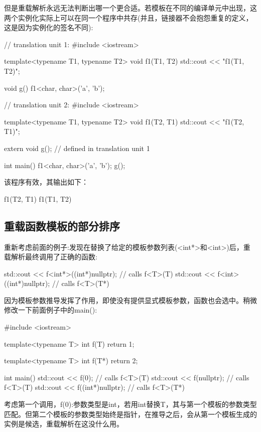 但是重载解析永远无法判断出哪一个更合适。若模板在不同的编译单元中出现，这两个实例化实际上可以在同一个程序中共存(并且，链接器不会抱怨重复的定义，这是因为实例化的签名不同):

\begin{cpp}
// translation unit 1:
#include <iostream>

template<typename T1, typename T2>
void f1(T1, T2)
{
	std::cout << "f1(T1, T2)\n";
}

void g()
{
	f1<char, char>(’a’, ’b’);
}

// translation unit 2:
#include <iostream>

template<typename T1, typename T2>
void f1(T2, T1)
{
	std::cout << "f1(T2, T1)\n";
}

extern void g(); // defined in translation unit 1

int main()
{
	f1<char, char>(’a’, ’b’);
	g();
}
\end{cpp}

该程序有效，其输出如下：

\begin{shell}
f1(T2, T1)
f1(T1, T2)
\end{shell}

\subsection{重载函数模板的部分排序}

重新考虑前面的例子:发现在替换了给定的模板参数列表(<int*>和<int>)后，重载解析最终调用了正确的函数:

\begin{shell}
std::cout << f<int*>((int*)nullptr); // calls f<T>(T)
std::cout << f<int>((int*)nullptr); // calls f<T>(T*)
\end{shell}

因为模板参数推导发挥了作用，即使没有提供显式模板参数，函数也会选中。稍微修改一下前面例子中的main():

\begin{cpp}
#include <iostream>

template<typename T>
int f(T)
{
	return 1;
}

template<typename T>
int f(T*)
{
	return 2;
}

int main()
{
	std::cout << f(0); // calls f<T>(T)
	std::cout << f(nullptr); // calls f<T>(T)
	std::cout << f((int*)nullptr); // calls f<T>(T*)
}
\end{cpp}

考虑第一个调用，f(0):参数类型是int，若用int替换T，其与第一个模板的参数类型匹配。但第二个模板的参数类型始终是指针，在推导之后，会从第一个模板生成的实例是候选，重载解析在这没什么用。

